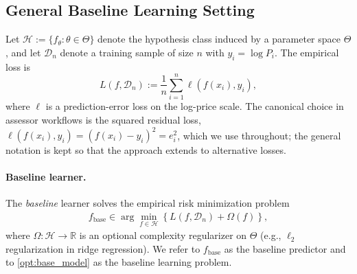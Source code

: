 \documentclass[12pt]{article}
\theoremstyle{plain}
\theoremstyle{definition}
\newcommand{\1}{\mathbf{1}}
\newcommand{\D}{\mathcal{D}}
\renewcommand{\H}{\mathcal{H}}
\begin{document}





\subsection{General Baseline Learning Setting}

Let
$
\H := \{f_\theta : \theta \in \Theta\}
$
denote the hypothesis class induced by a parameter space $\Theta$, and let $\D_n$ denote a training sample of size $n$ with $y_i=\log P_i$. The empirical loss is
\[
L(f, \D_n)
:=
\frac{1}{n}\sum_{i=1}^n \ell(f(x_i),y_i),
\]
where $\ell$ is a prediction-error loss on the log-price scale. The canonical choice in assessor workflows is the squared residual loss, $\ell(f(x_i),y_i)=(f(x_i)-y_i)^2=e_i^2$, which we use throughout; the general notation is kept so that the approach extends to alternative losses.

\paragraph{Baseline learner.} The \emph{baseline} learner solves the empirical risk minimization problem
\begin{align}
\label{opt:base_model}
f_{\mathrm{base}}
\in
\arg\min_{f \in \H}
\left\{
L(f, \D_n)+\Omega(f)
\right\},
\end{align}
where $\Omega:\H\to\mathbb R$ is an optional complexity regularizer on $\Theta$ (e.g., $\ell_2$ regularization in ridge regression). We refer to $f_{\mathrm{base}}$ as the baseline predictor and to \eqref{opt:base_model} as the baseline learning problem.
\end{document}

